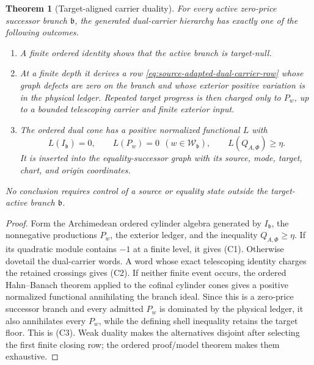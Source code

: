 \documentclass[11pt]{article}
\numberwithin{section}{part}
\theoremstyle{plain}
\newtheorem{theorem}{Theorem}[section]
\theoremstyle{definition}
\theoremstyle{remark}
\begin{document}
\begin{theorem}[Target-aligned carrier duality]
\label{thm:target-aligned-carrier-duality}
For every active zero-price successor branch \(\mathfrak b\), the generated
dual-carrier hierarchy has exactly one of the following outcomes.
\begin{enumerate}[label=\textup{(C\arabic*)}]
\item A finite ordered identity shows that the active branch is target-null.
\item At a finite depth it derives a row
\eqref{eq:source-adapted-dual-carrier-row} whose graph defects are zero on the
branch and whose exterior positive variation is in the physical ledger.
Repeated target progress is then charged only to \(P_w\), up to a bounded
telescoping carrier and finite exterior input.
\item The ordered dual cone has a positive normalized functional \(L\) with
\begin{equation}
 \label{eq:dual-carrier-separating-law}
 L(I_{\mathfrak b})=0,\qquad
 L(P_w)=0\ \ (w\in\mathscr W_{\mathfrak b}),
 \qquad L(Q_{A,\Phi})\ge\eta.
\end{equation}
It is inserted into the equality-successor graph with its source, mode,
target, chart, and origin coordinates.
\end{enumerate}
No conclusion requires control of a source or equality state outside the
target-active branch \(\mathfrak b\).
\end{theorem}

\begin{proof}
Form the Archimedean ordered cylinder algebra generated by
\(I_{\mathfrak b}\), the nonnegative productions \(P_w\), the exterior
ledger, and the inequality \(Q_{A,\Phi}\ge\eta\).  If its quadratic module
contains \(-1\) at a finite level, it gives \textup{(C1)}.  Otherwise dovetail
the dual-carrier words.  A word whose exact telescoping identity charges the
retained crossings gives \textup{(C2)}.  If neither finite event occurs, the
ordered Hahn--Banach theorem applied to the cofinal cylinder cones gives a
positive normalized functional annihilating the branch ideal.  Since this is
a zero-price successor branch and every admitted \(P_w\) is dominated by the
physical ledger, it also annihilates every \(P_w\), while the defining shell
inequality retains the target floor.  This is \textup{(C3)}.  Weak duality
makes the alternatives disjoint after selecting the first finite closing row;
the ordered proof/model theorem makes them exhaustive.
\end{proof}
\end{document}
